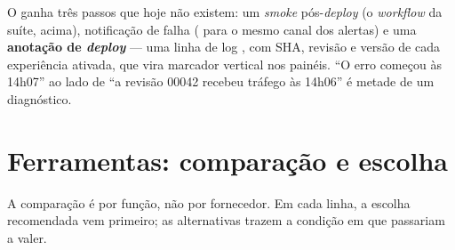 O  ganha três passos que hoje não existem: um
\emph{smoke} pós-\emph{deploy} (o \emph{workflow} da suíte, acima),
notificação de falha ( para o mesmo canal dos alertas) e
uma \textbf{anotação de \emph{deploy}} --- uma linha de log
, com SHA, revisão e versão de cada experiência ativada,
que vira marcador vertical nos painéis. \enquote{O erro começou às 14h07}
ao lado de \enquote{a revisão 00042 recebeu tráfego às 14h06} é metade de
um diagnóstico.

\section{Ferramentas: comparação e escolha}
\label{sec:ferramentas-obs}

A comparação é por função, não por fornecedor. Em cada linha, a escolha
recomendada vem primeiro; as alternativas trazem a condição em que passariam
a valer.

